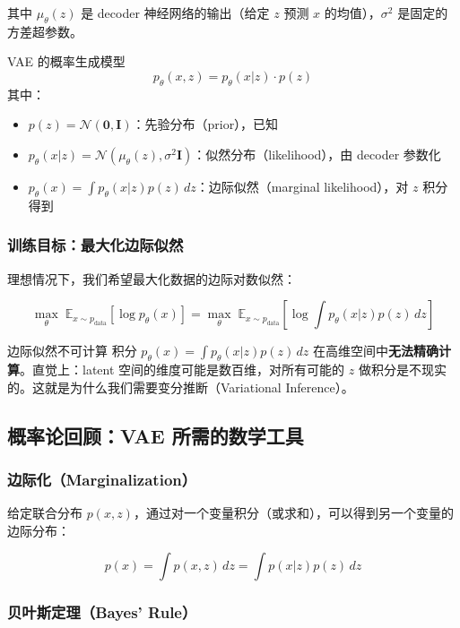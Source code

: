 \documentclass[a4paper]{article}
\begin{document}
其中 $\mu_\theta(z)$ 是 decoder 神经网络的输出（给定 $z$ 预测 $x$ 的均值），$\sigma^2$ 是固定的方差超参数。

\begin{importantbox}{VAE 的概率生成模型}
$$p_\theta(x, z) = p_\theta(x|z) \cdot p(z)$$
其中：
\begin{itemize}
    \item $p(z) = \mathcal{N}(\mathbf{0}, \mathbf{I})$：先验分布（prior），已知
    \item $p_\theta(x|z) = \mathcal{N}(\mu_\theta(z), \sigma^2 \mathbf{I})$：似然分布（likelihood），由 decoder 参数化
    \item $p_\theta(x) = \int p_\theta(x|z) p(z) \, dz$：边际似然（marginal likelihood），对 $z$ 积分得到
\end{itemize}
\end{importantbox}

\subsubsection{训练目标：最大化边际似然}

理想情况下，我们希望最大化数据的边际对数似然：

$$\max_\theta \; \mathbb{E}_{x \sim p_{\text{data}}} [\log p_\theta(x)] = \max_\theta \; \mathbb{E}_{x \sim p_{\text{data}}} \left[\log \int p_\theta(x|z) p(z) \, dz \right]$$

\begin{warningbox}{边际似然不可计算}
积分 $p_\theta(x) = \int p_\theta(x|z) p(z) \, dz$ 在高维空间中\textbf{无法精确计算}。直觉上：latent 空间的维度可能是数百维，对所有可能的 $z$ 做积分是不现实的。这就是为什么我们需要变分推断（Variational Inference）。
\end{warningbox}

\subsection{概率论回顾：VAE 所需的数学工具}

\subsubsection{边际化（Marginalization）}

给定联合分布 $p(x, z)$，通过对一个变量积分（或求和），可以得到另一个变量的边际分布：

$$p(x) = \int p(x, z) \, dz = \int p(x|z) p(z) \, dz$$

\subsubsection{贝叶斯定理（Bayes' Rule）}
\end{document}
